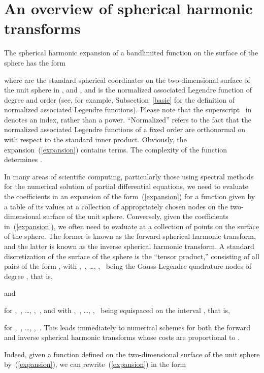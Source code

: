 \documentclass[final,3p,times]{elsarticle}
\begin{document}
\section{An overview of spherical harmonic transforms}
\label{overview}

The spherical harmonic expansion of a bandlimited function 
on the surface of the sphere has the form

where  are the standard spherical coordinates
on the two-dimensional surface of the unit sphere in ,
 and ,
and  is the normalized associated Legendre function
of degree  and order  (see, for example, Subsection~\ref{basic}
for the definition of normalized associated Legendre functions).
Please note that the superscript~ in  denotes an index,
rather than a power. ``Normalized'' refers to the fact that
the normalized associated Legendre functions
of a fixed order are orthonormal on 
with respect to the standard inner product.
Obviously, the expansion~(\ref{expansion}) contains  terms.
The complexity of the function  determines .

In many areas of scientific computing, particularly those
using spectral methods for the numerical solution
of partial differential equations,
we need to evaluate the coefficients 
in an expansion of the form~(\ref{expansion})
for a function  given by a table of its values
at a collection of appropriately chosen nodes
on the two-dimensional surface of the unit sphere.
Conversely, given the coefficients  in~(\ref{expansion}),
we often need to evaluate  at a collection of points
on the surface of the sphere.
The former is known as the forward spherical harmonic transform,
and the latter is known as the inverse spherical harmonic transform.
A standard discretization of the surface of the sphere
is the ``tensor product,''
consisting of all pairs of the form ,
with ,~, \dots,
,~
being the Gauss-Legendre quadrature nodes of degree , that is,

and

for ,~, \dots, ,~,
and with ,~, \dots, ,~
being equispaced on the interval , that is,

for ,~, \dots, ,~.
This leads immediately to numerical schemes
for both the forward and inverse spherical harmonic transforms
whose costs are proportional to .

Indeed, given a function  defined on the two-dimensional surface
of the unit sphere by~(\ref{expansion}),
we can rewrite~(\ref{expansion}) in the form
\end{document}
